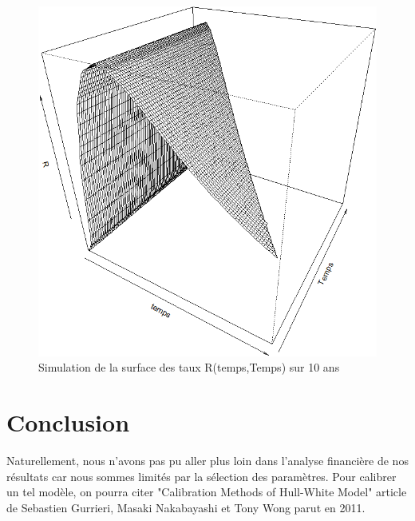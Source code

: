 \documentclass[11pt]{article}
\begin{document}
\begin{center}
\begin{figure}[H]
         \centering \includegraphics[scale=0.60]{R_surface}
        \caption{Simulation de la surface des taux R(temps,Temps) sur 10 ans}
\end{figure}
\end{center}

\section{Conclusion}

Naturellement, nous n'avons pas pu aller plus loin dans l'analyse financière de nos résultats car nous sommes limités par la sélection des paramètres. Pour calibrer un tel modèle,  on pourra citer "Calibration Methods of Hull-White Model" article de Sebastien Gurrieri, Masaki Nakabayashi et Tony Wong parut en 2011.

\nocite{*}



\pagebreak
\appendix
\end{document}
